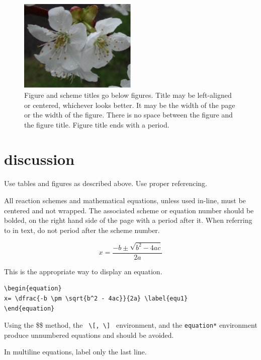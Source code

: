 \documentclass[10pt]{article}
\begin{document}
\begin{figure}[ht!]
\centering
\includegraphics[width=0.5\textwidth]{Untitled.png}
\caption{Figure and scheme titles go below figures. Title may be left-aligned or centered, whichever looks better. It may be the width of the page or the width of the figure. There is no space between the figure and the figure title. Figure title ends with a period.}\label{sample image}
\end{figure}

\section*{discussion}
Use tables and figures as described above. Use proper referencing.\cite{web}

All reaction schemes and mathematical equations, unless used in-line, must be centered and not wrapped. The associated scheme or equation number should be bolded, on the right hand side of the page with a period after it. When referring to  in text, do not period after the scheme number.

\begin{equation}
x= \dfrac{-b \pm \sqrt{b^2 - 4ac}}{2a} \label{equ1}
\end{equation}

This is the appropriate way to display an equation.

\begin{verbatim}
\begin{equation}
x= \dfrac{-b \pm \sqrt{b^2 - 4ac}}{2a} \label{equ1}
\end{equation}
\end{verbatim}

 Using the \$\$ method, the \verb+ \[, \] + environment, and the \verb+equation*+ environment produce unnumbered equations and should be avoided.

In multiline equations, label only the last line.
\end{document}
